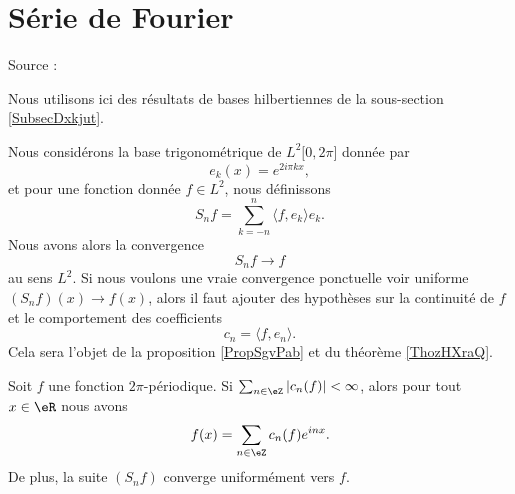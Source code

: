 
\section{Série de Fourier}

Source : \cite{MaureyHilbertFourier}

Nous utilisons ici des résultats de bases hilbertiennes de la sous-section \ref{SubsecDxkjut}.

Nous considérons la base trigonométrique de \( L^2\mathopen[ 0 , 2\pi \mathclose]\) donnée par
\begin{equation}
    e_k(x)= e^{2i\pi k x},
\end{equation}
et pour une fonction donnée \( f\in L^2\), nous définissons 
\begin{equation}
    S_nf=\sum_{k=-n}^n\langle f, e_k\rangle e_k.
\end{equation}
Nous avons alors la convergence
\begin{equation}
    S_nf\to f
\end{equation}
au sens \( L^2\). Si nous voulons une vraie convergence ponctuelle voir uniforme \( (S_nf)(x)\to f(x)\), alors il faut ajouter des hypothèses sur la continuité de \( f\) et le comportement des coefficients
\begin{equation}
    c_n=\langle f, e_n\rangle .
\end{equation}
Cela sera l'objet de la proposition \ref{PropSgvPab} et du théorème \ref{ThozHXraQ}.



\begin{proposition}     \label{PropSgvPab}
    Soit \( f\) une fonction \( 2\pi\)-périodique. Si \( \sum_{n\in \eZ}| c_n(f) |<\infty\), alors pour tout \( x\in \eR\) nous avons
    \begin{equation}
        f(x)=\sum_{n\in \eZ}c_n(f) e^{inx}.
    \end{equation}
    De plus, la suite \( (S_nf)\) converge uniformément vers \( f\).
\end{proposition}

